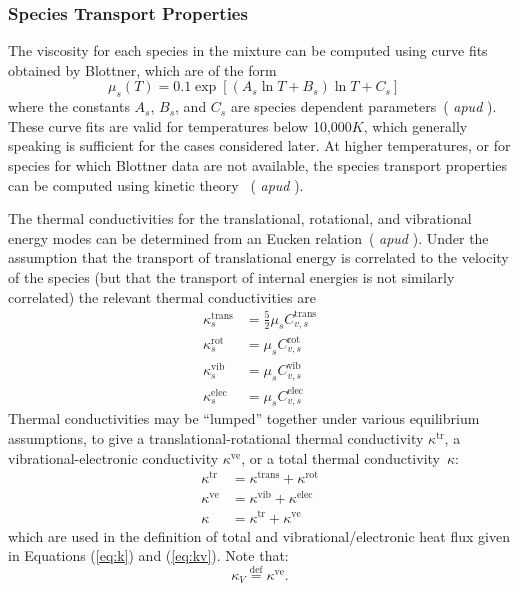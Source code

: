 \documentclass[10pt]{article}
\begin{document}
\subsubsection{Species Transport Properties}\label{sec:conductivity}
The viscosity for each species in the mixture can be computed using curve fits obtained by Blottner, which are of the form
\begin{equation}\label{eq:viscosity}
  \mu_s\left(T\right) = 0.1 \exp\left[\left(A_s \ln T + B_s\right) \ln T + C_s\right] \;\;\; %
\end{equation}
where the constants $A_s$, $B_s$, and $C_s$ are species dependent parameters~(\citet{blottner_viscous,wright_thesis} \textit{apud} \citet{Kirk2011}). These curve fits are valid for temperatures below 10,000$K$, %
which generally speaking is sufficient for the cases considered later. At higher temperatures, or for species for which Blottner data are not available, the species transport properties can be computed using kinetic theory~ (\citet{vincenti_kruger} \textit{apud} \citet{Kirk2011}).

The thermal conductivities for the translational, rotational, and vibrational energy modes can be determined from an Eucken relation~(\citet{vincenti_kruger} \textit{apud} \citet{Kirk2011}). Under the assumption that the transport of translational energy is correlated to the velocity of the species (but that the transport of internal energies is not similarly correlated) the relevant thermal conductivities are
\begin{align*}
  \kappa^{\text{trans}}_s &= \frac{5}{2} \mu_s C^{\text{trans}}_{v,s} \\
  \kappa^{\text{rot}}_s   &= \mu_s C^{\text{rot}}_{v,s} \\
  \kappa^{\text{vib}}_s   &= \mu_s C^{\text{vib}}_{v,s} \\
  \kappa^{\text{elec}}_s   &= \mu_s C^{\text{elec}}_{v,s}
\end{align*}
%
Thermal conductivities may be ``lumped'' together under various
equilibrium assumptions, to give a translational-rotational thermal
conductivity $\kappa^{\text{tr}}$, a vibrational-electronic conductivity
$\kappa^{\text{ve}}$,
or a total thermal conductivity~$\kappa$:
\begin{align}
  \label{eq:thermal_subconductivity_start}
  \kappa^{\text{tr}} &= \kappa^{\text{trans}} + \kappa^{\text{rot}} \\
  \kappa^{\text{ve}} &= \kappa^{\text{vib}} + \kappa^{\text{elec}} \\
  \kappa &= \kappa^{\text{tr}} + \kappa^{\text{ve}}
  \label{eq:thermal_subconductivity_end}
\end{align}
which are used in the definition of total and vibrational/electronic heat flux given in Equations (\ref{eq:k}) and (\ref{eq:kv}). Note that:
$$\kappa_V\stackrel{\text{def}}{=}  \kappa^{\text{ve}} .$$
%
\end{document}
